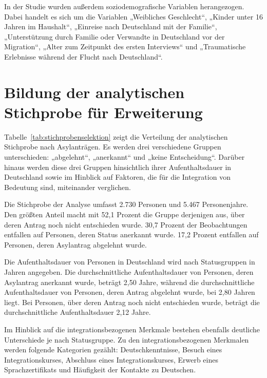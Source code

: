 In der Studie wurden außerdem soziodemografische Variablen herangezogen. Dabei handelt es sich um die Variablen „Weibliches Geschlecht“, „Kinder unter 16 Jahren im Haushalt“, „Einreise nach Deutschland mit der Familie“, „Unterstützung durch Familie oder Verwandte in Deutschland vor der Migration“, „Alter zum Zeitpunkt des ersten Interviews“ und „Traumatische Erlebnisse während der Flucht nach Deutschland“.


\section{Bildung der analytischen Stichprobe für Erweiterung}
\label{cha:stichprobe-erw}

Tabelle~\ref{tab:stichprobenselektion} zeigt die Verteilung der analytischen Stichprobe nach Asylanträgen. Es werden drei verschiedene Gruppen unterschieden: „abgelehnt“, „anerkannt“ und „keine Entscheidung“. Darüber hinaus werden diese drei Gruppen hinsichtlich ihrer Aufenthaltsdauer in Deutschland sowie im Hinblick auf Faktoren, die für die Integration von Bedeutung sind, miteinander verglichen.

Die Stichprobe der Analyse umfasst 2.730 Personen und 5.467 Personenjahre. Den größten Anteil macht mit 52,1 Prozent die Gruppe derjenigen aus, über deren Antrag noch nicht entschieden wurde. 30,7 Prozent der Beobachtungen entfallen auf Personen, deren Status anerkannt wurde. 17,2 Prozent entfallen auf Personen, deren Asylantrag abgelehnt wurde.

Die Aufenthaltsdauer von Personen in Deutschland wird nach Statusgruppen in Jahren angegeben. Die durchschnittliche Aufenthaltsdauer von Personen, deren Asylantrag anerkannt wurde, beträgt 2,50 Jahre, während die durchschnittliche Aufenthaltsdauer von Personen, deren Antrag abgelehnt wurde, bei 2,80 Jahren liegt. Bei Personen, über deren Antrag noch nicht entschieden wurde, beträgt die durchschnittliche Aufenthaltsdauer 2,12 Jahre.



Im Hinblick auf die integrationsbezogenen Merkmale bestehen ebenfalls deutliche Unterschiede je nach Statusgruppe. Zu den integrationsbezogenen Merkmalen werden folgende Kategorien gezählt: Deutschkenntnisse, Besuch eines Integrationskurses, Abschluss eines Integrationskurses, Erwerb eines Sprachzertifikats und Häufigkeit der Kontakte zu Deutschen.

